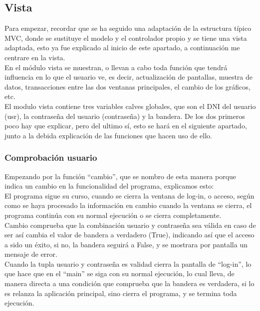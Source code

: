 \subsection{Vista}
Para empezar, recordar que se ha seguido una adaptación de la estructura  típico MVC, donde se sustituye el modelo y el controlador propio y se tiene una vista adaptada, esto ya fue explicado al inicio de este apartado, a continuación me centrare en la vista.\\

En el módulo vista se muestran, o llevan a cabo toda función que tendrá influencia en lo que el usuario ve, es decir, actualización de pantallas, muestra de datos, transacciones entre las dos ventanas principales, el cambio de los gráficos, etc.\\

El modulo vista contiene tres variables calves globales, que son el DNI del usuario (usr), la contraseña del usuario (contraseña) y la bandera. De los dos primeros poco hay que explicar, pero del ultimo sí, esto se hará en el siguiente apartado, junto a la debida explicación de las funciones que hacen uso de ello.\\
\subsubsection{Comprobación usuario}
Empezando por la función “cambio”, que se nombro de esta manera porque indica un cambio en la funcionalidad del programa, explicamos esto:\\
El programa sigue su curso, cuando se cierra la ventana de log-in, o acceso, según como se haya procesado la información en cambio cuando la ventana se cierra, el programa continúa con su normal ejecución o se cierra completamente.\\

Cambio comprueba que la combinación usuario y contraseña sea válida en caso de ser así cambia el valor de bandera a verdadero (True), indicando así que el acceso a sido un éxito, si no, la bandera seguirá a False, y se mostrara por pantalla un mensaje de error.\\

Cuando la tupla usuario y contraseña es validad cierra la pantalla de “log-in”, lo que hace que en el “main” se siga con su normal ejecución, lo cual lleva, de manera directa a una condición que comprueba que la bandera es verdadera, si lo es relanza la aplicación principal, sino cierra el programa, y se termina toda ejecución.\\

